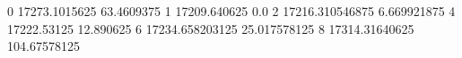 0 17273.1015625 63.4609375
1 17209.640625 0.0
2 17216.310546875 6.669921875
4 17222.53125 12.890625
6 17234.658203125 25.017578125
8 17314.31640625 104.67578125
